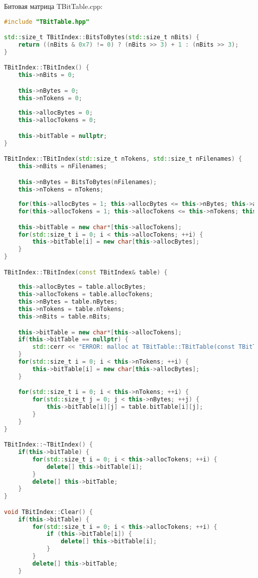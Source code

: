 Битовая матрица TBitTable.cpp:
\begin{lstlisting}[language=C++]
#include "TBitTable.hpp"

std::size_t TBitIndex::BitsToBytes(std::size_t nBits) {
    return ((nBits & 0x7) != 0) ? (nBits >> 3) + 1 : (nBits >> 3);
}

TBitIndex::TBitIndex() {
    this->nBits = 0;

    this->nBytes = 0;
    this->nTokens = 0;
    
    this->allocBytes = 0;
    this->allocTokens = 0;

    this->bitTable = nullptr;
}

TBitIndex::TBitIndex(std::size_t nTokens, std::size_t nFilenames) {
    this->nBits = nFilenames;

    this->nBytes = BitsToBytes(nFilenames);
    this->nTokens = nTokens;
    
    for(this->allocBytes = 1; this->allocBytes <= this->nBytes; this->allocBytes *= 2);
    for(this->allocTokens = 1; this->allocTokens <= this->nTokens; this->allocTokens *= 2);

    this->bitTable = new char*[this->allocTokens];
    for(std::size_t i = 0; i < this->allocTokens; ++i) {
        this->bitTable[i] = new char[this->allocBytes];
    }
}

TBitIndex::TBitIndex(const TBitIndex& table) {
    
    this->allocBytes = table.allocBytes;
    this->allocTokens = table.allocTokens;
    this->nBytes = table.nBytes;
    this->nTokens = table.nTokens;
    this->nBits = table.nBits;

    this->bitTable = new char*[this->allocTokens];
    if(this->bitTable == nullptr) {
        std::cerr << "ERROR: malloc at TBitTable::TBitTable(const TBitTable&)!" << std::endl;
    }
    for(std::size_t i = 0; i < this->nTokens; ++i) {
        this->bitTable[i] = new char[this->allocBytes];
    }

    for(std::size_t i = 0; i < this->nTokens; ++i) {
        for(std::size_t j = 0; j < this->nBytes; ++j) {
            this->bitTable[i][j] = table.bitTable[i][j];
        }
    }
}

TBitIndex::~TBitIndex() {
    if(this->bitTable) {
        for(std::size_t i = 0; i < this->allocTokens; ++i) {
            delete[] this->bitTable[i];
        }
        delete[] this->bitTable;
    }
}

void TBitIndex::Clear() {
    if(this->bitTable) {
        for(std::size_t i = 0; i < this->allocTokens; ++i) {
            if (this->bitTable[i]) {
                delete[] this->bitTable[i];
            }
        }
        delete[] this->bitTable;
    }


\end{lstlisting}
